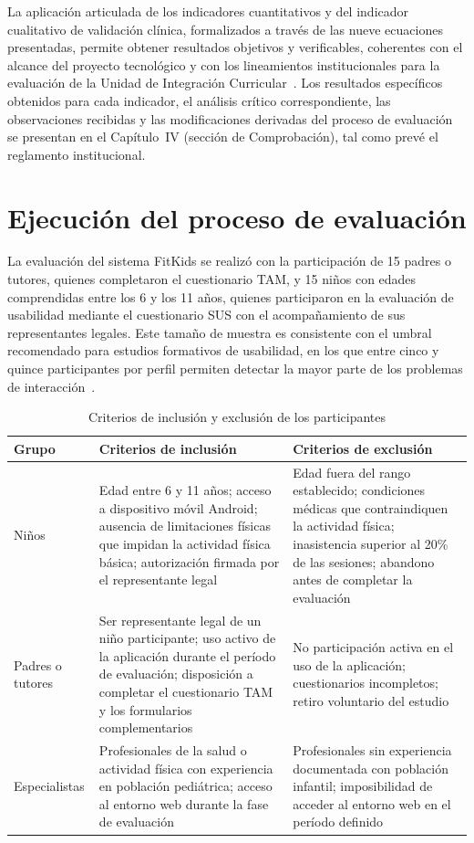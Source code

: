 				La aplicación articulada de los indicadores cuantitativos y del indicador cualitativo de validación clínica, formalizados a través de las nueve ecuaciones presentadas, permite obtener resultados objetivos y verificables, coherentes con el alcance del proyecto tecnológico y con los lineamientos institucionales para la evaluación de la Unidad de Integración Curricular~\cite{GuerreroUlloa2024}. Los resultados específicos obtenidos para cada indicador, el análisis crítico correspondiente, las observaciones recibidas y las modificaciones derivadas del proceso de evaluación se presentan en el Capítulo~IV (sección de Comprobación), tal como prevé el reglamento institucional.
				
		\section{Ejecución del proceso de evaluación}
			La evaluación del sistema FitKids se realizó con la participación de 15 padres o tutores, quienes completaron el cuestionario TAM, y 15 niños con edades comprendidas entre los 6 y los 11 años, quienes participaron en la evaluación de usabilidad mediante el cuestionario SUS con el acompañamiento de sus representantes legales. Este tamaño de muestra es consistente con el umbral recomendado para estudios formativos de usabilidad, en los que entre cinco y quince participantes por perfil permiten detectar la mayor parte de los problemas de interacción~\cite{Nielsen1994,Bangor2009}.
			
			\begin{table}[!hpt]
				\centering
				\small
				\caption{Criterios de inclusión y exclusión de los participantes}
				\label{tab:criterios}
				\begin{tabular}{p{2.8cm}p{5.5cm}p{5.5cm}}
					\hline
					\textbf{Grupo} & \textbf{Criterios de inclusión} & \textbf{Criterios de exclusión} \\
					\hline
					Niños & Edad entre 6 y 11 años; acceso a dispositivo móvil Android; ausencia de limitaciones físicas que impidan la actividad física básica; autorización firmada por el representante legal & Edad fuera del rango establecido; condiciones médicas que contraindiquen la actividad física; inasistencia superior al 20\% de las sesiones; abandono antes de completar la evaluación \\
					
					Padres o tutores & Ser representante legal de un niño participante; uso activo de la aplicación durante el período de evaluación; disposición a completar el cuestionario TAM y los formularios complementarios & No participación activa en el uso de la aplicación; cuestionarios incompletos; retiro voluntario del estudio \\
					
					Especialistas & Profesionales de la salud o actividad física con experiencia en población pediátrica; acceso al entorno web durante la fase de evaluación & Profesionales sin experiencia documentada con población infantil; imposibilidad de acceder al entorno web en el período definido \\
					\hline
				\end{tabular}
			\end{table} 
			\tblnote
			

